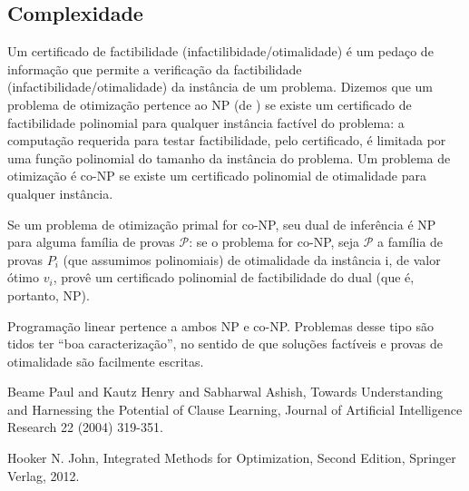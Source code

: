 
\subsection{Complexidade}

Um certificado de factibilidade (infactilibidade/otimalidade) é um pedaço de
informação que permite a verificação da factibilidade (infactibilidade/otimalidade) da instância de
um problema. Dizemos que um problema de otimização pertence ao NP (de ) se existe um certificado de factibilidade polinomial para qualquer instância factível
do problema: a computação requerida para testar factibilidade, pelo certificado, é limitada por uma
função polinomial do tamanho da instância do problema. Um problema de otimização é co-NP se existe
um certificado polinomial de otimalidade para qualquer instância.

Se um problema de otimização primal for co-NP, seu dual de inferência é NP para alguma família de
provas $\mathcal{P}$: se o problema for co-NP, seja $\mathcal{P}$ a família de provas $P_i$ (que
assumimos polinomiais) de otimalidade da instância i, de valor ótimo $v_i$, provê um certificado
polinomial de factibilidade do dual (que é, portanto, NP).

Programação linear pertence a ambos NP e co-NP. Problemas desse tipo são tidos ter ``boa
caracterização'', no sentido de que soluções factíveis e provas de otimalidade são facilmente
escritas.

  \begin{thebibliography}{1}

    Beame Paul and Kautz Henry and Sabharwal Ashish,
    Towards Understanding and Harnessing the Potential of Clause Learning,
    Journal of Artificial Intelligence Research 22 (2004) 319-351.


    Hooker N. John, Integrated Methods for Optimization, Second Edition, Springer Verlag, 2012.

  \end{thebibliography}

%
